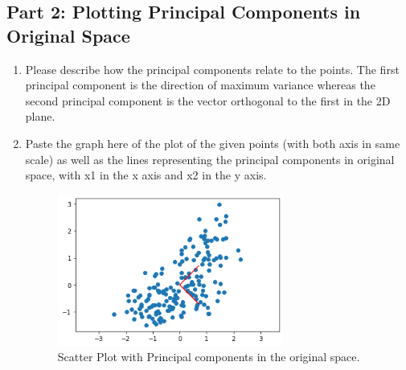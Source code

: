 \subsection{Part 2: Plotting Principal Components in Original Space}
\begin{enumerate}
    \item Please describe how the principal components relate to the points.
\newline
\newline
    The first principal component is the direction of maximum variance whereas the second principal component is the vector orthogonal to the first in the 2D plane.
    \item Paste the graph here of the plot of the given points (with both axis in same scale) as well as the lines representing the principal components in original space, with x1 in the x axis and x2 in the y axis.
    
\begin{figure}[H]
\centering
\includegraphics[width=0.7\textwidth]{templates/pca_simple}
\caption{Scatter Plot with Principal components in the original space.}
\label{fig:my_label}
\end{figure}
    
\end{enumerate}

